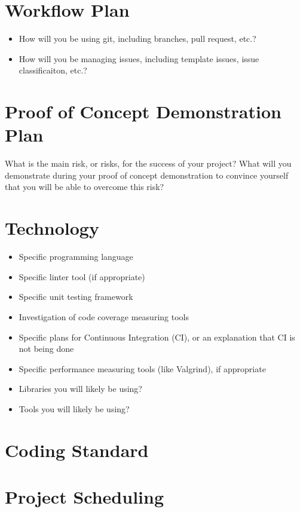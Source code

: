 \documentclass{article}
\begin{document}
\section{Workflow Plan}

\begin{itemize}
	\item How will you be using git, including branches, pull request, etc.?
	\item How will you be managing issues, including template issues, issue
	classificaiton, etc.?
\end{itemize}

\section{Proof of Concept Demonstration Plan}

What is the main risk, or risks, for the success of your project?  What will you
demonstrate during your proof of concept demonstration to convince yourself that
you will be able to overcome this risk?

\section{Technology}

\begin{itemize}
\item Specific programming language
\item Specific linter tool (if appropriate)
\item Specific unit testing framework
\item Investigation of code coverage measuring tools
\item Specific plans for Continuous Integration (CI), or an explanation that CI
  is not being done
\item Specific performance measuring tools (like Valgrind), if
  appropriate
\item Libraries you will likely be using?
\item Tools you will likely be using?
\end{itemize}

\section{Coding Standard}

\section{Project Scheduling}

\end{document}
